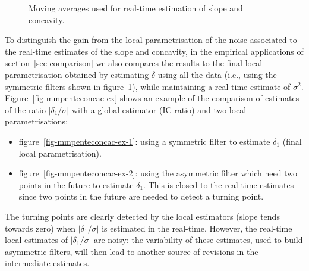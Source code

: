\documentclass[
]{article}
\newcommand\1{\mathds{1}}
\begin{document}
\begin{figure}[H]

\caption{\label{fig-mmpenteconcac}Moving averages used for real-time
estimation of slope and concavity.}


\end{figure}%

To distinguish the gain from the local parametrisation of the noise
associated to the real-time estimates of the slope and concavity, in the
empirical applications of section~\ref{sec-comparison} we also compares
the results to the final local parametrisation obtained by estimating
\(\delta\) using all the data (i.e., using the symmetric filters shown
in figure~\ref{fig-mmpenteconcac}), while maintaining a real-time
estimate of \(\sigma^2\). Figure~\ref{fig-mmpenteconcac-ex} shows an
example of the comparison of estimates of the ratio
\(|\delta_1/\sigma|\) with a global estimator (IC ratio) and two local
parametrisations:

\begin{itemize}
\item
  figure~\ref{fig-mmpenteconcac-ex-1}: using a symmetric filter to
  estimate \(\delta_1\) (final local parametrisation).
\item
  figure~\ref{fig-mmpenteconcac-ex-2}: using the asymmetric filter which
  need two points in the future to estimate \(\delta_1\). This is closed
  to the real-time estimates since two points in the future are needed
  to detect a turning point.
\end{itemize}

The turning points are clearly detected by the local estimators (slope
tends towards zero) when \(|\delta_1/\sigma|\) is estimated in the
real-time. However, the real-time local estimates of
\(|\delta_1/\sigma|\) are noisy: the variability of these estimates,
used to build asymmetric filters, will then lead to another source of
revisions in the intermediate estimates.
\end{document}

